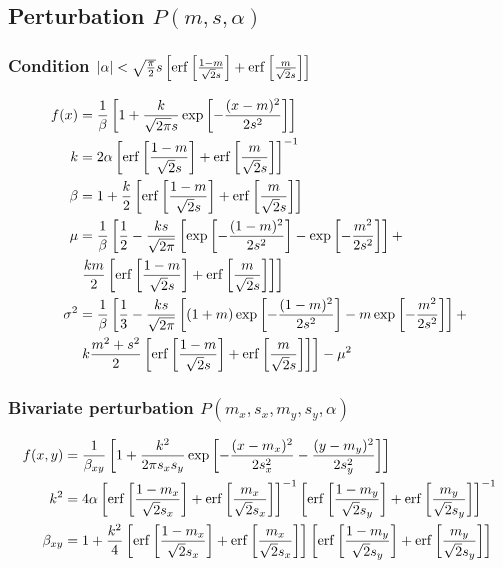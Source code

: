 \documentclass[10pt,a4paper]{article}
\begin{document}
\subsection{Perturbation $P(m,s,\alpha)$}
\subsubsection*{Condition $|\alpha|<\sqrt{\frac{\pi}{2}}s\left[
\erf\left[\frac{1-m}{\sqrt{2}s}\right]+
\erf\left[\frac{m}{\sqrt{2}s}\right]\right]$}
\begin{align}
f(x)&=\frac{1}{\beta}\left[1+\frac{k}{\sqrt{2\pi}s}
\exp\left[-\frac{(x-m)^2}{2s^2}\right]\right]\\
k&=2\alpha\left[\erf\left[\frac{1-m}{\sqrt{2}s}\right]+
\erf\left[\frac{m}{\sqrt{2}s}\right]\right]^{-1}\\
\beta&=1+\frac{k}{2}\left[\erf\left[\frac{1-m}{\sqrt{2}s}\right]+
\erf\left[\frac{m}{\sqrt{2}s}\right]\right]\\
\mu&=\frac{1}{\beta}\left[\frac{1}{2}-\frac{ks}{\sqrt{2\pi}}\left[
\exp\left[-\frac{(1-m)^2}{2s^2}\right]-\exp\left[-\frac{m^2}{2s^2}\right]
\right]+\right.\nonumber\\
&\left.\frac{km}{2}\left[\erf\left[\frac{1-m}{\sqrt{2}s}\right]+
\erf\left[\frac{m}{\sqrt{2}s}\right]\right]\right]\\
\sigma^2&=\frac{1}{\beta}\left[\frac{1}{3}-
\frac{ks}{\sqrt{2\pi}}\left[(1+m)\exp\left[-\frac{(1-m)^2}{2s^2}\right]-
m\exp\left[-\frac{m^2}{2s^2}\right]\right]+\right.\nonumber\\
&\left.k\frac{m^2+s^2}{2}\left[\erf\left[\frac{1-m}{\sqrt{2}s}\right]+
\erf\left[\frac{m}{\sqrt{2}s}\right]\right]\right]-\mu^2
\end{align}

\subsubsection*{Bivariate perturbation $P(m_x,s_x,m_y,s_y,\alpha)$}
\begin{align}
f(x,y)&=\frac{1}{\beta_{xy}}\left[1+\frac{k^2}{{2\pi}s_xs_y}
\exp\left[-\frac{(x-m_x)^2}{2s_x^2}-\frac{(y-m_y)^2}{2s_y^2}\right]\right]\\
k^2&=4\alpha\left[\erf\left[\frac{1-m_x}{\sqrt{2}s_x}\right]+
\erf\left[\frac{m_x}{\sqrt{2}s_x}\right]\right]^{-1}
\left[\erf\left[\frac{1-m_y}{\sqrt{2}s_y}\right]+
\erf\left[\frac{m_y}{\sqrt{2}s_y}\right]\right]^{-1}\\
\beta_{xy}&=1+\frac{k^2}{4}\left[\erf\left[\frac{1-m_x}{\sqrt{2}s_x}\right]+
\erf\left[\frac{m_x}{\sqrt{2}s_x}\right]\right]
\left[\erf\left[\frac{1-m_y}{\sqrt{2}s_y}\right]+
\erf\left[\frac{m_y}{\sqrt{2}s_y}\right]\right]
\end{align}
\end{document}
